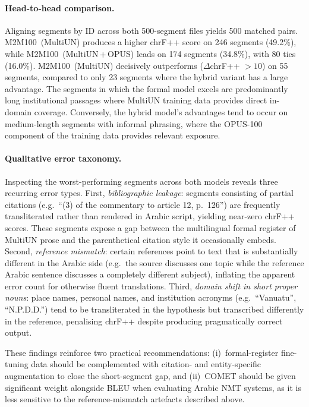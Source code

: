 \documentclass{article}
\begin{document}
	\paragraph{Head-to-head comparison.}
	Aligning segments by ID across both 500-segment files yields 500 matched pairs.
	M2M100~(MultiUN) produces a higher chrF++ score on 246 segments (49.2\%), while
	M2M100~(MultiUN\,+\,OPUS) leads on 174 segments (34.8\%), with 80 ties (16.0\%).
	M2M100~(MultiUN) decisively outperforms ($\Delta$chrF++ $> 10$) on 55 segments,
	compared to only 23 segments where the hybrid variant has a large advantage. The segments
	in which the formal model excels are predominantly long institutional passages where
	MultiUN training data provides direct in-domain coverage. Conversely, the hybrid model's
	advantages tend to occur on medium-length segments with informal phrasing, where the
	OPUS-100 component of the training data provides relevant exposure.
	
	\paragraph{Qualitative error taxonomy.}
	Inspecting the worst-performing segments across both models reveals three recurring
	error types. First, \emph{bibliographic leakage}: segments consisting of partial
	citations (e.g.\ ``(3) of the commentary to article 12, p.~126'') are frequently
	transliterated rather than rendered in Arabic script, yielding near-zero chrF++ scores.
	These segments expose a gap between the multilingual formal register of MultiUN prose and
	the parenthetical citation style it occasionally embeds. Second, \emph{reference mismatch}:
	certain references point to text that is substantially different in the Arabic side (e.g.\
	the source discusses one topic while the reference Arabic sentence discusses a completely
	different subject), inflating the apparent error count for otherwise fluent translations. Third,
	\emph{domain shift in short proper nouns}: place names, personal names, and
	institution acronyms (e.g.\ ``Vanuatu'', ``N.P.D.D.'') tend to be transliterated in the
	hypothesis but transcribed differently in the reference, penalising chrF++ despite producing
	pragmatically correct output.
	
	These findings reinforce two practical recommendations: (i)~formal-register fine-tuning
	data should be complemented with citation- and entity-specific augmentation to close the
	short-segment gap, and (ii)~COMET should be given significant weight alongside BLEU when
	evaluating Arabic NMT systems, as it is less sensitive to the reference-mismatch artefacts
	described above.
	
\end{document}
